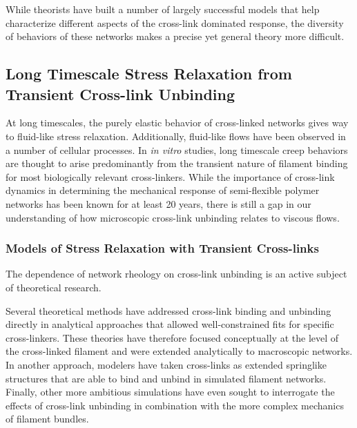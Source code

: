 \documentclass[pre,preprint]{revtex4-1}
\begin{document}
While theorists have built a number of largely successful models that help characterize different aspects of the cross-link dominated response\cite{theo_nonaffine2,theo_floppy,theo_crosslinknonlinear}, the diversity of behaviors of these networks makes a precise yet general theory more difficult.

\subsection{Long Timescale Stress Relaxation from Transient Cross-link Unbinding}

At long timescales, the purely elastic behavior of cross-linked networks gives way to fluid-like stress relaxation. Additionally, fluid-like flows have been observed in a number of cellular processes\cite{cellmech_flows,cellmech_flows2,cellmech_flows3,rheo_fluid,rheo_fluid2,cell_rheo_exp}.  In {\em in vitro} studies, long timescale creep behaviors are thought to arise predominantly from the transient nature of filament binding for most biologically relevant cross-linkers\cite{rheo_crosslinkslip1,rheo_crosslinkslip2,rheo_crosslinkslip3,rheo_nonaffine}.  While the importance of cross-link dynamics in determining the mechanical response of semi-flexible polymer networks has been known for at least 20 years\cite{rheo_crosslinksmatter}, there is still a gap in our understanding of how microscopic cross-link unbinding relates to viscous flows. 

\subsubsection{Models of Stress Relaxation with Transient Cross-links}

The dependence of network rheology on cross-link unbinding is an active subject of theoretical research\cite{theo_crosslinkslip2}.  

Several theoretical methods have addressed cross-link binding and unbinding directly \cite{theo_crosslinkslip1,theo_crosslinkslip2} in analytical approaches that allowed well-constrained fits for specific cross-linkers.  These theories have therefore focused conceptually at the level of the cross-linked filament and were extended analytically to macroscopic networks.  In another approach, modelers have taken cross-links as extended springlike structures \cite{model_taeyoon} that are able to bind and unbind in simulated filament networks. Finally, other more ambitious simulations have even sought to interrogate the effects of cross-link unbinding in combination with the more complex mechanics of filament bundles\cite{rheo_crosslinkslip2,theo_crosslinkslip3}.
\end{document}
